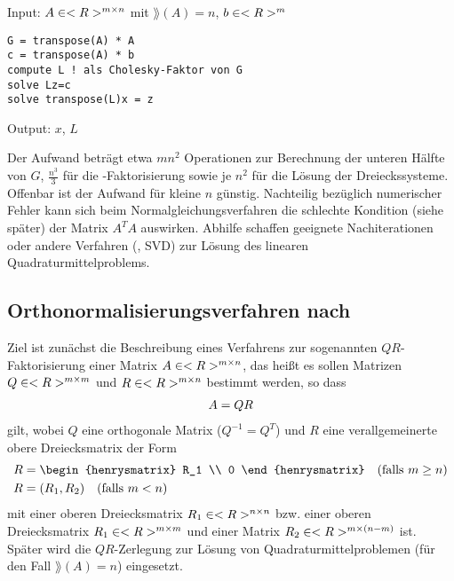 \begin{algorithm}
	Input: $A\in<R>^{m\times n}$ mit $\rang(A)=n$, $b\in<R>^m$
	\begin{lstlisting}
G = transpose(A) * A
c = transpose(A) * b
compute L ! als Cholesky-Faktor von G
solve Lz=c
solve transpose(L)x = z
	\end{lstlisting}
	Output: $x$, $L$
\end{algorithm}

\begin{remark}
	Der Aufwand beträgt etwa $mn^2$ Operationen zur Berechnung der unteren Hälfte von $G$, $\frac{n^3}{3}$ für die -Faktorisierung sowie je $n^2$ für die Lösung der Dreieckssysteme. Offenbar ist der Aufwand für kleine $n$ günstig. Nachteilig bezüglich numerischer Fehler kann sich beim Normalgleichungsverfahren die schlechte Kondition (siehe später) der Matrix $A^TA$ auswirken. Abhilfe schaffen geeignete Nachiterationen oder andere Verfahren (, SVD) zur Lösung des linearen Quadraturmittelproblems.
\end{remark}

\subsection{Orthonormalisierungsverfahren nach }

Ziel ist zunächst die Beschreibung eines Verfahrens zur sogenannten $QR$-Faktorisierung einer Matrix $A\in<R>^{m\times n}$, das heißt es sollen Matrizen $Q\in<R>^{m\times m}$ und $R\in<R>^{m\times n}$ bestimmt werden, so dass
\begin{align}
	A = QR\notag
\end{align}
gilt, wobei $Q$ eine orthogonale Matrix ($Q^{-1}=Q^T$) und $R$ eine verallgemeinerte obere Dreiecksmatrix der Form
\begin{align}
	R &= \begin{henrysmatrix}
	R_1 \\ 0
	\end{henrysmatrix} \quad\text{(falls $m\ge n$)} \notag \\
	R &= (R_1,R_2) \quad\text{(falls $m < n$)} \notag
\end{align}
mit einer oberen Dreiecksmatrix $R_1\in<R>^{n\times n}$ bzw. einer oberen Dreiecksmatrix $R_1\in<R>^{m\times m}$ und einer Matrix $R_2\in<R>^{m\times (n-m)}$ ist. Später wird die $QR$-Zerlegung zur Lösung von Quadraturmittelproblemen (für den Fall $\rang(A)=n$) eingesetzt.

